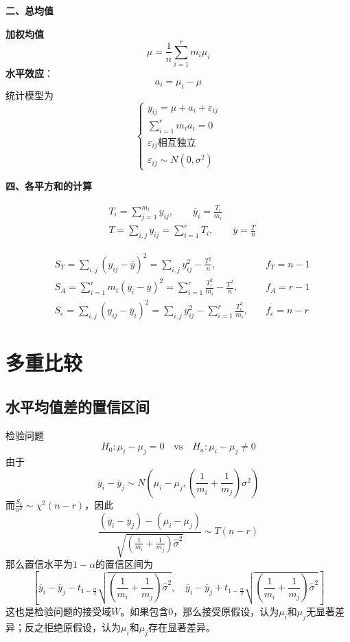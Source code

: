 \documentclass[lang = cn, scheme = chinese, thmcnt = section]{elegantbook}
\begin{document}
\textbf{二、总均值}

\textbf{加权均值}
$$
\mu=\frac{1}{n}\sum_{i=1}^{r}{m_i\mu_i}
$$
\textbf{水平效应}：
$$
a_i=\mu_i-\mu
$$
统计模型为
$$
\begin{cases}
	y_{ij}=\mu+a_i+\varepsilon_{ij}\\
	\sum_{i=1}^{r}{m_ia_i}=0\\
	\varepsilon_{ij}相互独立\\
	\varepsilon_{ij}\sim N(0,\sigma^2)
\end{cases}
$$

\textbf{四、各平方和的计算}

\begin{align*}
	& T_i=\sum_{j=1}^{m_i}{y_{ij}},\qquad 
	\overline{y}_i=\frac{T_i}{m_i}\\
	& T=\sum_{i,j}{y_{ij}}=\sum_{i=1}^{r}T_i,\qquad \overline{y}=\frac{T}{n}
\end{align*}

\begin{align*}
	&S_T=\sum_{i,j}{(y_{ij}-\overline{y})^2}=\sum_{i,j}{y_{ij}^2}-\frac{T^2}{n}
	,\quad & f_T=n-1\\
	&S_A=\sum_{i=1}^{r}{m_i(\overline{y}_{i}-\overline{y})^2}=\sum_{i=1}^{r}{\frac{T_i^2}{m_i}}-\frac{T^2}{n}
	,\quad & f_A=r-1\\
	&S_e=\sum_{i,j}{(y_{ij}-\overline{y}_i)^2}=\sum_{i,j}{y_{ij}^2}-\sum_{i=1}^{r}{\frac{T_i^2}{m_i}}
	,\quad&  f_e=n-r
\end{align*}

\section{多重比较}

\subsection{水平均值差的置信区间}

检验问题
$$
H_0:\mu_i-\mu_j=0\quad \mathrm{vs} \quad H_a:\mu_i-\mu_j\ne0
$$
由于
$$
\overline{y}_i-\overline{y}_j\sim N\left( \mu_i-\mu_j,\left( \frac{1}{m_i}+\frac{1}{m_j} \right)\sigma^2 \right)
$$
而$\frac{S_e}{\sigma^2}\sim\chi^2(n-r)$，因此
$$
\frac{(\overline{y}_i-\overline{y}_j)-(\mu_i-\mu_j)}{\sqrt{\left( \frac{1}{m_i}+\frac{1}{m_j} \right)\hat{\sigma}^2}}\sim T(n-r)
$$
那么置信水平为$1-\alpha$的置信区间为
$$
\left[
\overline{y}_i-\overline{y}_j-t_{1-\frac{\alpha}{2}}\sqrt{\left( \frac{1}{m_i}+\frac{1}{m_j} \right)\hat{\sigma}^2},\quad
\overline{y}_i-\overline{y}_j+t_{1-\frac{\alpha}{2}}\sqrt{\left( \frac{1}{m_i}+\frac{1}{m_j} \right)\hat{\sigma}^2}
\right]
$$
这也是检验问题的接受域$\overline{W}$。如果包含$0$，那么接受原假设，认为$\mu_i$和$\mu_j$无显著差异；反之拒绝原假设，认为$\mu_i$和$\mu_j$存在显著差异。
\end{document}
